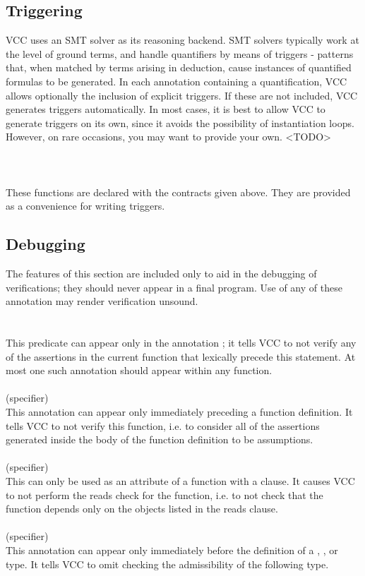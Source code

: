 \documentclass[preprint,nocopyrightspace]{sigplanconf}
\begin{document}
{{\subsection{Triggering}
VCC uses an SMT solver as its reasoning backend. SMT solvers typically
work at the level of ground terms, and handle quantifiers by means of
triggers - patterns that, when matched by terms arising in deduction,
cause instances of quantified formulas to be generated. In each
annotation containing a quantification, VCC allows optionally the
inclusion of explicit triggers. If these are not included, VCC
generates triggers automatically. In most cases, it is best to allow
VCC to generate triggers on its own, since it avoids the possibility
of instantiation loops. However, on rare occasions, you may want to
provide your own. <TODO>
\\\\
\\
\\
These functions are declared with the contracts given above. They are provided as a
convenience for writing triggers. 

\subsection{Debugging}
The features of this section are included only to aid in the debugging
of verifications; they should never appear in a final program. Use of
any of these annotation may render verification unsound.
\\\\
\\
This predicate can appear only in the
annotation ; it tells VCC to not verify
any of the assertions in the current function that lexically precede
this statement. At most one such annotation should appear within any
function. 
\\\\
 (specifier)\\
This annotation can appear only immediately preceding a function
definition. It tells VCC to not verify this function, i.e. to consider
all of the assertions generated inside the body of the function
definition to be assumptions.
\\\\
 (specifier)\\
This  can only be used as an attribute of a  function
with a  clause. It causes VCC to not perform the reads
check for the function, i.e. to not check that the function depends
only on the objects listed in the reads clause.
\\\\
 (specifier)\\
This annotation can appear only immediately before the definition of
a , , or  type. It tells VCC to
omit checking the admissibility of the following type.

}}
\end{document}
